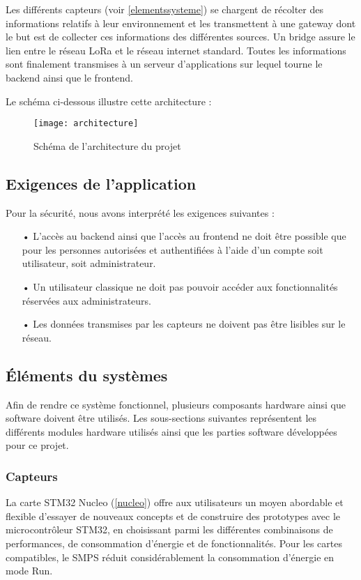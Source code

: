 Les différents capteurs (voir \autoref{elementssysteme}) se chargent de récolter des informations relatifs à leur environnement et les transmettent à une gateway dont le but est de collecter ces informations des différentes sources. Un bridge assure le lien entre le réseau LoRa et le réseau internet standard. Toutes les informations sont finalement transmises à un serveur d'applications sur lequel tourne le backend ainsi que le frontend.

Le schéma ci-dessous illustre cette architecture :

\begin{figure}[h!]
\texttt{[image: architecture]}
\caption{Schéma de l'architecture du projet}
\end{figure}

\subsection{Exigences de l'application} %

Pour la sécurité, nous avons interprété les exigences suivantes :

\begin{itemize}
\item[•] L'accès au backend ainsi que l'accès au frontend ne doit être possible que pour les personnes autorisées et authentifiées à l'aide d'un compte soit utilisateur, soit administrateur.
\item[•] Un utilisateur classique ne doit pas pouvoir accéder aux fonctionnalités réservées aux administrateurs.
\item[•] Les données transmises par les capteurs ne doivent pas être lisibles sur le réseau.
\end{itemize}

\newpage
\subsection{Éléments du systèmes}\label{elementssysteme} %

Afin de rendre ce système fonctionnel, plusieurs composants hardware ainsi que software doivent être utilisés. Les sous-sections suivantes représentent les différents modules hardware utilisés ainsi que les parties software développées pour ce projet.

\subsubsection{Capteurs}
La carte STM32 Nucleo (\autoref{nucleo}) offre aux utilisateurs un moyen abordable et flexible d'essayer de nouveaux concepts et de construire des prototypes avec le microcontrôleur STM32, en choisissant parmi les différentes combinaisons de performances, de consommation d'énergie et de fonctionnalités. Pour les cartes compatibles, le SMPS réduit considérablement la consommation d'énergie en mode Run.

